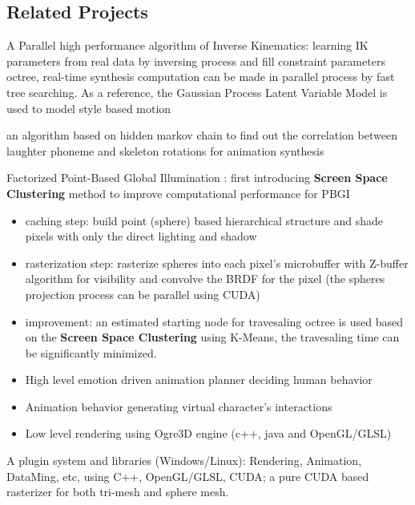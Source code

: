 \subsection{Related Projects}
{
A Parallel high performance algorithm of Inverse Kinematics: learning IK parameters from real data by inversing process and fill constraint parameters octree, real-time synthesis computation can be made in parallel process by fast tree searching. As a reference, the Gaussian Process Latent Variable Model is used to model style based motion}

{
an algorithm based on hidden markov chain to find out the correlation between laughter phoneme and skeleton rotations for animation synthesis 
}

{
Factorized Point-Based Global Illumination : first introducing \textbf{Screen Space Clustering} method to improve computational performance for PBGI
\begin{itemize}
	\item caching step: build point (sphere) based hierarchical structure and shade pixels with only the direct lighting and shadow
	\item rasterization step: rasterize spheres into each pixel's microbuffer with Z-buffer algorithm for visibility and convolve the BRDF for the pixel (the spheres projection process can be parallel using CUDA)
	\item improvement: an estimated starting node for travesaling octree is used based on the \textbf{Screen Space Clustering} using K-Means, the travesaling time can be significantly minimized.
\end{itemize}
}

{
\begin{itemize}
\item High level emotion driven animation planner deciding human behavior
\item Animation behavior generating virtual character's interactions
\item Low level rendering using Ogre3D engine (c++, java and OpenGL/GLSL)
\end{itemize}
}

{
A plugin system and libraries (Windows/Linux): Rendering, Animation, DataMing, etc,
using C++, OpenGL/GLSL, CUDA; a pure CUDA based rasterizer for both tri-mesh and sphere mesh.
}

